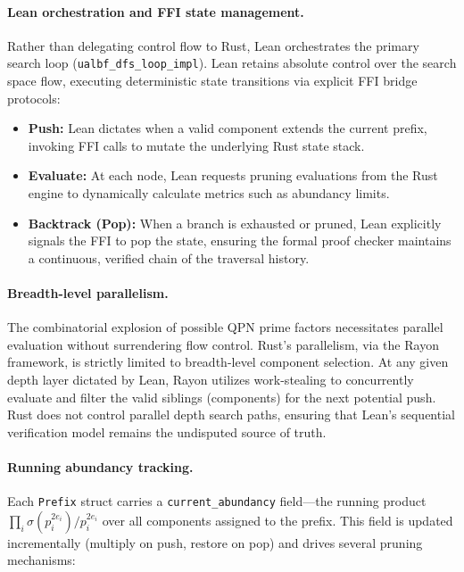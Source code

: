 \paragraph{Lean orchestration and FFI state management.}
Rather than delegating control flow to Rust, Lean orchestrates the primary
search loop (\texttt{ualbf\_\allowbreak{}dfs\_\allowbreak{}loop\_\allowbreak{}impl}). Lean retains absolute control over the search space
flow, executing deterministic state transitions via explicit FFI bridge protocols:
\begin{itemize}
  \item \textbf{Push:} Lean dictates when a valid component extends the current prefix, invoking FFI calls to mutate the underlying Rust state stack.
  \item \textbf{Evaluate:} At each node, Lean requests pruning evaluations from the Rust engine to dynamically calculate metrics such as abundancy limits.
  \item \textbf{Backtrack (Pop):} When a branch is exhausted or pruned, Lean explicitly signals the FFI to pop the state, ensuring the formal proof checker maintains a continuous, verified chain of the traversal history.
\end{itemize}

\paragraph{Breadth-level parallelism.}
The combinatorial explosion of possible QPN prime factors necessitates parallel evaluation without surrendering flow control. Rust's parallelism, via the Rayon framework, is strictly limited to breadth-level component selection. At any given depth layer dictated by Lean, Rayon utilizes work-stealing to concurrently evaluate and filter the valid siblings (components) for the next potential push. Rust does not control parallel depth search paths, ensuring that Lean's sequential verification model remains the undisputed source of truth.

\paragraph{Running abundancy tracking.}
Each \texttt{Prefix} struct carries a
\texttt{current\_\allowbreak{}abundancy} field---the running product
$\prod_{i} \sigma(p_i^{2e_i})/p_i^{2e_i}$ over all components assigned
to the prefix.  This field is updated incrementally (multiply on push,
restore on pop) and drives several pruning mechanisms:

